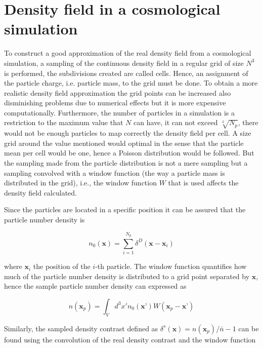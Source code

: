 \section{Density field in a cosmological simulation}

To construct a good approximation of the real density field from a cosmological simulation, 
a sampling of the continuous density field in a regular grid of size $N^3$ is 
performed, the subdivisions created are called cells. Hence, an assignment of the 
particle charge, i.e. particle mass, to the grid must be done. To obtain a more realistic 
density field approximation the grid points can be increased also disminishing problems 
due to numerical effects but it is more expensive computationally. Furthermore, the number 
of particles in a simulation is a restriction to the maximum value that $N$ can have, 
it can not exceed $\sqrt[3]{N_p}$, there would not be enough particles to map correctly 
the density field per cell. A size grid around the value mentioned would optimal in 
the sense that the particle mean per cell would be one, hence a Poisson distribution 
would be followed. But the sampling made from the particle distribution is not a 
mere sampling but a sampling convolved with a window function (the way a particle 
mass is distributed in the grid), i.e., the window function $W$ that is used affects 
the density field calculated. 

Since the particles are located in a specific position it can be assured that
the particle number density is 

\[n_0(\textbf{x}) = \sum_{i=1}^{N_{p}} \delta^D ( \textbf{x} - \textbf{x}_i )\]

where $\textbf{x}_i$ the position of the $i$-th particle. The window function 
quantifies how much of the particle number density is distributed to a grid point 
separated by $\textbf{x}$, hence the sample particle number density can expressed as 

\[n(\textbf{x}_p) = \int_V d^3 x' n_0(\textbf{x'}) W(\textbf{x}_p-\textbf{x'})\]

Similarly, the sampled density contrast defined as $\delta^s(\textbf{x})=n(\textbf{x}_p)/\bar{n}-1$ 
can be found using the convolution of the real density contrast and the window function 

